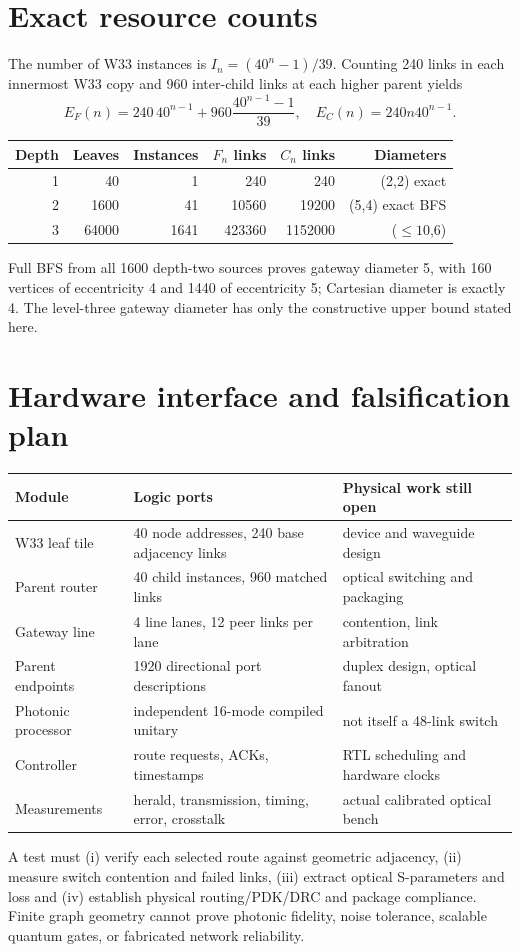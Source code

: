 \documentclass[10pt]{article}
\begin{document}
\section{Exact resource counts}
The number of W33 instances is $I_n=(40^n-1)/39$. Counting 240 links in each innermost W33 copy and 960 inter-child links at each higher parent yields
\[
E_F(n)=240\,40^{n-1}+960\frac{40^{n-1}-1}{39},
\quad E_C(n)=240n40^{n-1}.
\]
\begin{center}\begin{tabular}{rrrrrr}\toprule
Depth&Leaves&Instances&$F_n$ links&$C_n$ links&Diameters\\\midrule
1&40&1&240&240&(2,2) exact\\
2&1600&41&10560&19200&(5,4) exact BFS\\
3&64000&1641&423360&1152000&($\le 10$,6)\\\bottomrule
\end{tabular}\end{center}
Full BFS from all 1600 depth-two sources proves gateway diameter 5, with 160 vertices of eccentricity 4 and 1440 of eccentricity 5; Cartesian diameter is exactly 4. The level-three gateway diameter has only the constructive upper bound stated here.
\section{Hardware interface and falsification plan}
\begin{longtable}{p{.24\linewidth}p{.38\linewidth}p{.26\linewidth}}\toprule
Module&Logic ports&Physical work still open\\\midrule
W33 leaf tile&40 node addresses, 240 base adjacency links&device and waveguide design\\
Parent router&40 child instances, 960 matched links&optical switching and packaging\\
Gateway line&4 line lanes, 12 peer links per lane&contention, link arbitration\\
Parent endpoints&1920 directional port descriptions&duplex design, optical fanout\\
Photonic processor&independent 16-mode compiled unitary&not itself a 48-link switch\\
Controller&route requests, ACKs, timestamps&RTL scheduling and hardware clocks\\
Measurements&herald, transmission, timing, error, crosstalk&actual calibrated optical bench\\\bottomrule
\end{longtable}
A test must (i) verify each selected route against geometric adjacency, (ii) measure switch contention and failed links, (iii) extract optical S-parameters and loss and (iv) establish physical routing/PDK/DRC and package compliance. Finite graph geometry cannot prove photonic fidelity, noise tolerance, scalable quantum gates, or fabricated network reliability.
\end{document}
